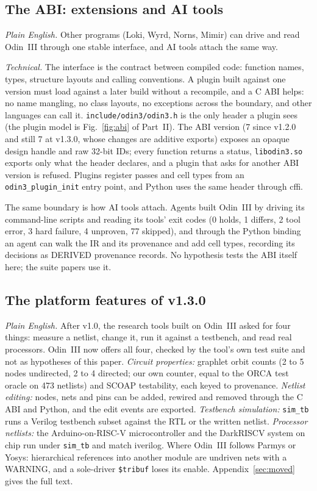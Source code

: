 \documentclass[conference]{IEEEtran}
\newcommand{\code}[1]{\texttt{#1}}
\begin{document}
\subsection{The ABI: extensions and AI tools}
\label{sec:abi-summary}

\emph{Plain English.} Other programs (Loki, Wyrd, Norns, Mimir) can drive and read Odin~III through one stable interface, and AI tools attach the same way.

\emph{Technical.} The interface is the contract between compiled code: function names, types, structure layouts and calling conventions. A plugin built against one version must load against a later build without a recompile, and a C ABI helps: no name mangling, no class layouts, no exceptions across the boundary, and other languages can call it. \code{include/odin3/odin3.h} is the only header a plugin sees (the plugin model is Fig.~\ref{fig:abi} of Part~II). The ABI version (7 since v1.2.0 and still 7 at v1.3.0, whose changes are additive exports) exposes an opaque design handle and raw 32-bit IDs; every function returns a status, \code{libodin3.so} exports only what the header declares, and a plugin that asks for another ABI version is refused. Plugins register passes and cell types from an \code{odin3\_plugin\_init} entry point, and Python uses the same header through cffi.

The same boundary is how AI tools attach. Agents built Odin~III by driving its command-line scripts and reading its tools' exit codes (0 holds, 1 differs, 2 tool error, 3 hard failure, 4 unproven, 77 skipped), and through the Python binding an agent can walk the IR and its provenance and add cell types, recording its decisions as DERIVED provenance records. No hypothesis tests the ABI itself here; the suite papers use it.

\subsection{The platform features of v1.3.0}
\label{sec:platform}

\emph{Plain English.} After v1.0, the research tools built on Odin~III asked for four things: measure a netlist, change it, run it against a testbench, and read real processors. Odin~III now offers all four, checked by the tool's own test suite and not as hypotheses of this paper. \emph{Circuit properties:} graphlet orbit counts (2 to 5 nodes undirected, 2 to 4 directed; our own counter, equal to the ORCA test oracle on 473 netlists) and SCOAP testability, each keyed to provenance. \emph{Netlist editing:} nodes, nets and pins can be added, rewired and removed through the C ABI and Python, and the edit events are exported. \emph{Testbench simulation:} \code{sim\_tb} runs a Verilog testbench subset against the RTL or the written netlist. \emph{Processor netlists:} the Arduino-on-RISC-V microcontroller and the DarkRISCV system on chip run under \code{sim\_tb} and match iverilog. Where Odin~III follows Parmys or Yosys: hierarchical references into another module are undriven nets with a WARNING, and a sole-driver \code{\$tribuf} loses its enable. Appendix~\ref{sec:moved} gives the full text.
\end{document}
